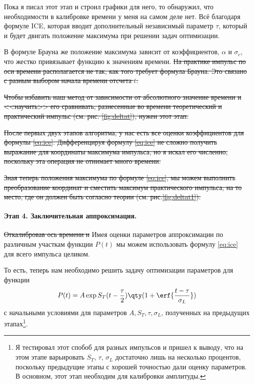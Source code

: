 Пока я писал этот этап и строил графики для него, то обнаружил, что
необходимости в калибровке времени у меня на самом деле нет. Всё благодаря
формуле ICE, которая вводит дополнительный независимый параметр $\tau$, который
и будет двигать положение максимума при решении задач оптимизации. 

В формуле Брауна же положение максимума зависит от коэффициентов, $\alpha$ и
$\sigma_c$, что жестко привязывает функцию к значениям времени. 
\sout{На практике импульс по оси времени располагается не так, как того требует
формула Брауна. Это связано с разным выбором начала времени отсчета $t$. }

\sout{Чтобы избавить наш метод от зависимости от абсолютного значение времени и
<<научить>> его сравнивать, разнесенные во времени теоретический и практический
импульс (см. рис. \ref{fig:deltat}), нужен этот этап. }

\sout{После первых двух этапов алгоритма, у нас есть все оценки коэффициентов для
формулы \eqref{eq:ice}. Дифференцируя формулу \eqref{eq:ice} не сложно получить
выражание для координаты максимума импульса, но я искал его численно, поскольку
эта операция не отнимает много времени.}

\sout{Зная теперь положения максимума по формуле \eqref{eq:ice}, мы можем выполнить
преобразование координат и сместить максимум практического импульса, на то
место, где он должен быть согласно теории (см. рис.\ref{fig:deltat1}).}

\paragraph{Этап 4. Заключительная аппроксимация.}%
\label{par:etap_4_zakliuchitel_naia_approksimatsiia_}

\sout{Откалибровав ось времени и}  Имея оценки параметров аппроксимации по различным
участкам функции $P(t)$ мы можем использовать формулу  \eqref{eq:ice} для всего
импульса целиком.

То есть, теперь нам необходимо решить задачу оптимизации параметров для функции 
\begin{equation}
    \label{eq:ice}
    P(t) = A \exp{ S_T (t - \frac{\tau}{2})} \qty(1 + \erf{\frac{t-
    \tau}{\sigma_L}})
\end{equation}
с начальными условиями для параметров $A, S_T, \tau, \sigma_L$, полученных на
предыдущих этапах\footnote{ Я тестировал этот спобоб для разных импульсов и
пришел к выводу, что на этом этапе варьировать $S_T$,  $\tau$,  $\sigma_L$
достаточно лишь на несколько процентов, поскольку предыдущие этапы с хорошей
точностью дали оценку параметров. В основном, этот этап необходим для
калибровки амплитуды.}. 


